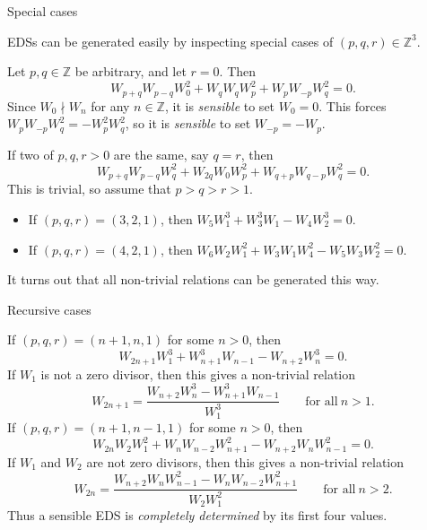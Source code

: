 \documentclass[10pt]{beamer}
\begin{document}
\begin{frame}[t]{Special cases}

EDSs can be generated easily by inspecting special cases of $ (p, q, r) \in \mathbb{Z}^3 $.

\vspace{0.5cm} Let $ p, q \in \mathbb{Z} $ be arbitrary, and let $ r = 0 $. Then
$$ W_{p + q}W_{p - q}W_0^2 + W_qW_qW_p^2 + W_pW_{-p}W_q^2 = 0. $$
Since $ W_0 \nmid W_n $ for any $ n \in \mathbb{Z} $, it is \emph{sensible} to set $ W_0 = 0 $. This forces $ W_pW_{-p}W_q^2 = -W_p^2W_q^2 $, so it is \emph{sensible} to set $ W_{-p} = -W_p $.

\vspace{0.5cm} If two of $ p, q, r > 0 $ are the same, say $ q = r $, then
$$ W_{p + q}W_{p - q}W_q^2 + W_{2q}W_0W_p^2 + W_{q + p}W_{q - p}W_q^2 = 0. $$
This is trivial, so assume that $ p > q > r > 1 $.
\begin{itemize}
\item If $ (p, q, r) = (3, 2, 1) $, then $ W_5W_1^3 + W_3^3W_1 - W_4W_2^3 = 0 $.
\item If $ (p, q, r) = (4, 2, 1) $, then $ W_6W_2W_1^2 + W_3W_1W_4^2 - W_5W_3W_2^2 = 0 $.
\end{itemize}
It turns out that all non-trivial relations can be generated this way.

\end{frame}

\begin{frame}[t]{Recursive cases}

If $ (p, q, r) = (n + 1, n, 1) $ for some $ n > 0 $, then
$$ W_{2n + 1}W_1^3 + W_{n + 1}^3W_{n - 1} - W_{n + 2}W_n^3 = 0. $$
If $ W_1 $ is not a zero divisor, then this gives a non-trivial relation
$$ W_{2n + 1} = \dfrac{W_{n + 2}W_n^3 - W_{n + 1}^3W_{n - 1}}{W_1^3} \qquad \text{for all} \ n > 1. $$
If $ (p, q, r) = (n + 1, n - 1, 1) $ for some $ n > 0 $, then
$$ W_{2n}W_2W_1^2 + W_nW_{n - 2}W_{n + 1}^2 - W_{n + 2}W_nW_{n - 1}^2 = 0. $$
If $ W_1 $ and $ W_2 $ are not zero divisors, then this gives a non-trivial relation
$$ W_{2n} = \dfrac{W_{n + 2}W_nW_{n - 1}^2 - W_nW_{n - 2}W_{n + 1}^2}{W_2W_1^2} \qquad \text{for all} \ n > 2. $$
Thus a sensible EDS is \emph{completely determined} by its first four values.

\end{frame}
\end{document}
